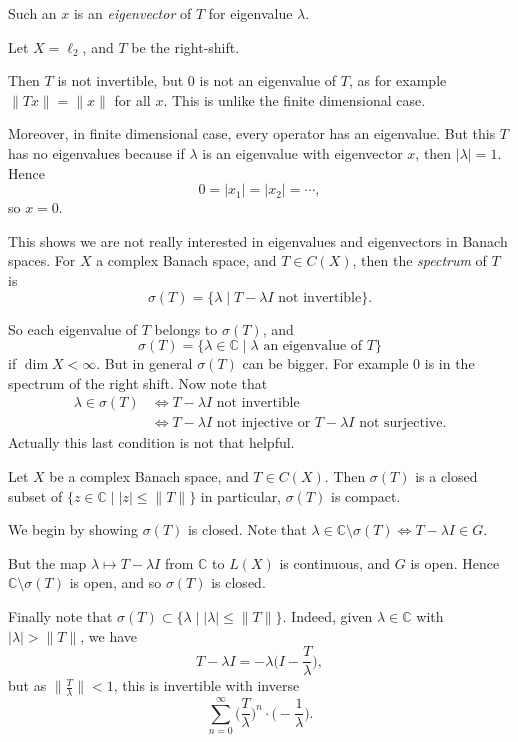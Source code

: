 \documentclass[12pt]{article}
\begin{document}
Such an $x$ is an \emph{eigenvector} of $T$ for eigenvalue $\lambda$.

\begin{exbox}
	Let $X = \ell_2$, and $T$ be the right-shift.

	Then $T$ is not invertible, but $0$ is not an eigenvalue of $T$, as for example $\|Tx\| = \|x\|$ for all $x$. This is unlike the finite dimensional case.

	Moreover, in finite dimensional case, every operator has an eigenvalue. But this $T$ has no eigenvalues because if $\lambda$ is an eigenvalue with eigenvector $x$, then $|\lambda| = 1$. Hence
	\[
	0 = |x_1| = |x_2| = \cdots,
	\]
	so $x = 0$.
\end{exbox}

This shows we are not really interested in eigenvalues and eigenvectors in Banach spaces. For $X$ a complex Banach space, and $T \in C(X)$, then the \emph{spectrum} of $T$ is
\[
	\sigma(T) = \{\lambda \mid T - \lambda I \text{ not invertible}\}.
\]

So each eigenvalue of $T$ belongs to $\sigma(T)$, and
\[
	\sigma(T) = \{\lambda \in \mathbb{C} \mid \lambda \text{ an eigenvalue of } T\}
\]
if $\dim X < \infty$. But in general $\sigma(T)$ can be bigger. For example $0$ is in the spectrum of the right shift. Now note that
\begin{align*}
\lambda \in \sigma(T) &\iff T - \lambda I \text{ not invertible} \\
		      &\iff T - \lambda I \text{ not injective or } T - \lambda I \text{ not surjective}.
\end{align*}
Actually this last condition is not that helpful.

\begin{proposition}
	Let $X$ be a complex Banach space, and $T \in C(X)$. Then $\sigma(T)$ is a closed subset of $\{z \in \mathbb{C} \mid |z| \leq \|T\|\}$ in particular, $\sigma(T)$ is compact.
\end{proposition}

\begin{proofbox}
We begin by showing $\sigma(T)$ is closed. Note that $\lambda \in \mathbb{C}\setminus \sigma(T) \iff T - \lambda I \in G$.

But the map $\lambda \mapsto T - \lambda I$ from $\mathbb{C}$ to $L(X)$ is continuous, and $G$ is open. Hence $\mathbb{C} \setminus \sigma(T)$ is open, and so $\sigma(T)$ is closed.

Finally note that $\sigma(T) \subset \{ \lambda \mid |\lambda| \leq \|T\|\}$. Indeed, given $\lambda \in \mathbb{C}$ with $|\lambda| > \|T\|$, we have
\[
T - \lambda I = -\lambda \biggl( I - \frac{T}{\lambda} \biggr),
\]
but as $\|\frac{T}{\lambda}\| < 1$, this is invertible with inverse
\[
\sum_{n = 0}^{\infty} \biggl( \frac{T}{\lambda} \biggr)^{n} \cdot \biggl(- \frac{1}{\lambda} \biggr).
\]
\end{proofbox}
\end{document}
